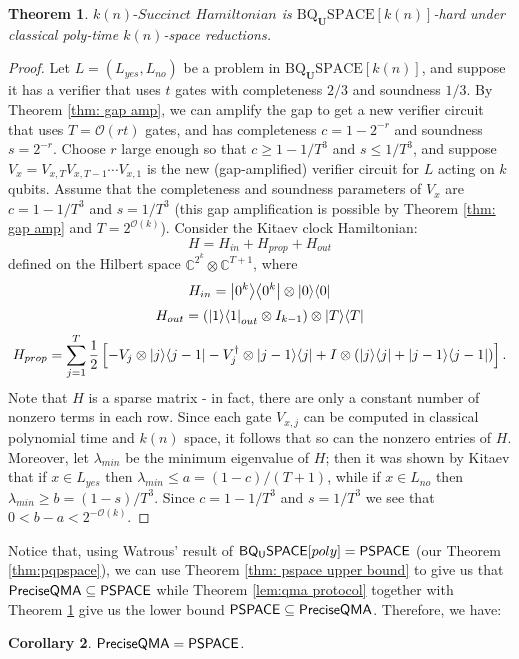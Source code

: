 \documentclass[11pt]{article}
\newtheorem{theorem}{Theorem}
\newtheorem{corollary}[theorem]{Corollary}
\theoremstyle{definition}
\theoremstyle{remark}
\newcommand\BQSPACE{{\sf{BQ_{U}SPACE}}}
\newcommand\PSPACE{{\sf{PSPACE}}}
\newcommand\QMAexp{\sf{PreciseQMA}}
\newcommand\spechamiltonian[1]{#1\textit{-Succinct Hamiltonian}}
\newcommand{\classfont}{\mathrm}
\newcommand{\Unitary}{\mathbf{U}}
\newcommand{\unitaryBQSPACE}[1]{\classfont{BQ}_\Unitary\classfont{SPACE}[#1]}
\begin{document}
\begin{theorem}\label{thm: specham-hardness}
$\spechamiltonian{k(n)}$ is $\unitaryBQSPACE{k(n)}$-hard under classical poly-time $k(n)$-space reductions.
\end{theorem}
\begin{proof}
Let $L=(L_{yes},L_{no})$ be a problem in $\unitaryBQSPACE{k(n)}$, and suppose it has a verifier that uses $t$ gates with completeness $2/3$ and soundness $1/3$. By Theorem \ref{thm: gap amp}, we can   amplify the gap to get a new verifier circuit that uses $T=\mathcal{O}(rt)$ gates, and has completeness $c=1-2^{-r}$ and soundness $s=2^{-r}$. Choose $r$ large enough so that $c \ge 1 - 1/T^3$ and $s \le 1/T^3$, and suppose $V_x=V_{x,T}V_{x,T-1}\cdots V_{x,1}$ is the new (gap-amplified) verifier circuit for $L$ acting on $k$ qubits. Assume that the completeness and soundness parameters of $V_x$ are $c=1-1/T^3$ and $s=1/T^3$ (this gap amplification is possible by Theorem \ref{thm: gap amp} and $T=2^{\mathcal{O}(k)}$). Consider the Kitaev clock Hamiltonian:
\begin{equation}
H = H_{in} + H_{prop} + H_{out}
\end{equation}
defined on the Hilbert space $\mathbb{C}^{2^k} \otimes \mathbb{C}^{T+1}$, where
\begin{equation}
H_{in} = {\left\vert{0^k}\right\rangle}{\left\langle{0^k}\right\vert} \otimes {\left\vert{0}\right\rangle}{\left\langle{0}\right\vert}
\end{equation}
\begin{equation}
H_{out} = ({\left\vert{1}\right\rangle}{\left\langle{1}\right\vert}_{out} \otimes I_{k-1}) \otimes {\left\vert{T}\right\rangle}{\left\langle{T}\right\vert}
\end{equation}
\begin{equation}
H_{prop} = \sum_{j=1}^T \frac{1}{2} \left[ - V_j \otimes {\left\vert{j}\right\rangle}{\left\langle{j-1}\right\vert} - V_j^\dagger \otimes {\left\vert{j-1}\right\rangle}{\left\langle{j}\right\vert} + I \otimes ({\left\vert{j}\right\rangle}{\left\langle{j}\right\vert} + {\left\vert{j-1}\right\rangle}{\left\langle{j-1}\right\vert}) \right].
\end{equation}
Note that $H$ is a sparse matrix - in fact, there are only a constant number of nonzero terms in each row. Since each gate $V_{x,j}$ can be computed in classical polynomial time and $k(n)$ space, it follows that so can the nonzero entries of $H$. Moreover, let $\lambda_{min}$ be the minimum eigenvalue of $H$; then it was shown by Kitaev \cite{ksv02} that if $x \in L_{yes}$ then $\lambda_{min} \le a = (1-c)/(T+1)$, while if $x \in L_{no}$ then $\lambda_{min} \ge b = (1-s)/T^3$. Since $c = 1-1/T^3$ and $s = 1/T^3$ we see that $0 < b-a < 2^{-\mathcal{O}(k)}$. 
\end{proof}

Notice that, using Watrous' result of $\BQSPACE[poly]=\PSPACE$ (our Theorem \ref{thm:pqpspace}), we can use Theorem \ref{thm: pspace upper bound} to give us that $\QMAexp\subseteq\PSPACE$ while Theorem \ref{lem:qma protocol} together with Theorem \ref{thm: specham-hardness} give us the lower bound $\PSPACE\subseteq\QMAexp$.  Therefore, we have:
\begin{corollary} $\QMAexp=\PSPACE$. \end{corollary}
\end{document}
